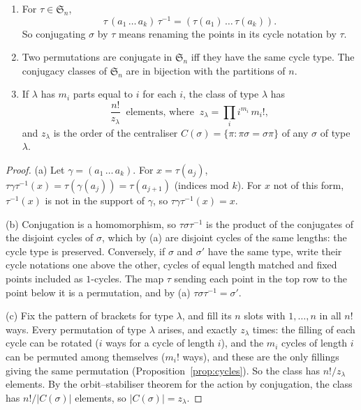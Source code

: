 \begin{proposition}\label{prop:conjSn}
\begin{enumerate}[label=(\alph*)]
\item For $\tau\in\mathfrak S_n$,
\[
\tau\,(a_1\,\dots\,a_k)\,\tau^{-1}=(\tau(a_1)\,\dots\,\tau(a_k)).
\]
So conjugating $\sigma$ by $\tau$ means renaming the points in its cycle notation by $\tau$.
\item Two permutations are conjugate in $\mathfrak S_n$ iff they have the same cycle type. The conjugacy classes of $\mathfrak S_n$ are in bijection with the partitions of $n$.
\item If $\lambda$ has $m_i$ parts equal to $i$ for each $i$, the class of type $\lambda$ has
\[
\frac{n!}{z_\lambda}\ \text{ elements, where }\ z_\lambda=\prod_i i^{m_i}\,m_i!,
\]
and $z_\lambda$ is the order of the centraliser $C(\sigma)=\{\pi:\pi\sigma=\sigma\pi\}$ of any $\sigma$ of type $\lambda$.
\end{enumerate}
\end{proposition}
\begin{proof}
(a) Let $\gamma=(a_1\,\dots\,a_k)$. For $x=\tau(a_j)$, $\tau\gamma\tau^{-1}(x)=\tau(\gamma(a_j))=\tau(a_{j+1})$ (indices mod $k$). For $x$ not of this form, $\tau^{-1}(x)$ is not in the support of $\gamma$, so $\tau\gamma\tau^{-1}(x)=x$.

(b) Conjugation is a homomorphism, so $\tau\sigma\tau^{-1}$ is the product of the conjugates of the disjoint cycles of $\sigma$, which by (a) are disjoint cycles of the same lengths: the cycle type is preserved. Conversely, if $\sigma$ and $\sigma'$ have the same type, write their cycle notations one above the other, cycles of equal length matched and fixed points included as $1$-cycles. The map $\tau$ sending each point in the top row to the point below it is a permutation, and by (a) $\tau\sigma\tau^{-1}=\sigma'$.

(c) Fix the pattern of brackets for type $\lambda$, and fill its $n$ slots with $1,\dots,n$ in all $n!$ ways. Every permutation of type $\lambda$ arises, and exactly $z_\lambda$ times: the filling of each cycle can be rotated ($i$ ways for a cycle of length $i$), and the $m_i$ cycles of length $i$ can be permuted among themselves ($m_i!$ ways), and these are the only fillings giving the same permutation (Proposition~\ref{prop:cycles}). So the class has $n!/z_\lambda$ elements. By the orbit--stabiliser theorem for the action by conjugation, the class has $n!/|C(\sigma)|$ elements, so $|C(\sigma)|=z_\lambda$.
\end{proof}

